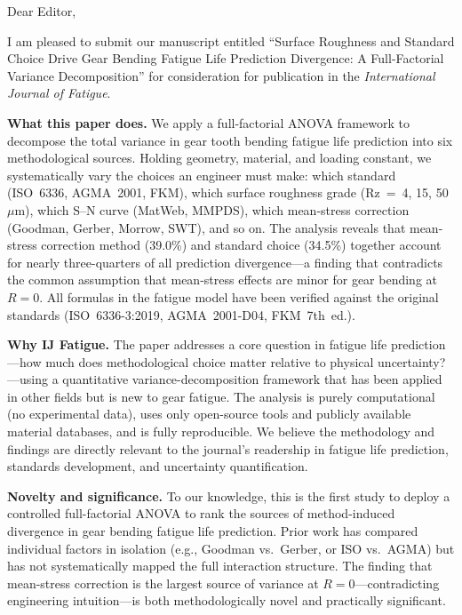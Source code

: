 \documentclass[12pt,a4paper]{article}
\begin{document}
\noindent Dear Editor,

\vspace{6pt}

\noindent I am pleased to submit our manuscript entitled
``Surface Roughness and Standard Choice Drive Gear Bending Fatigue
Life Prediction Divergence: A Full-Factorial Variance Decomposition''
for consideration for publication in the \textit{International Journal
of Fatigue}.

\vspace{6pt}

\noindent\textbf{What this paper does.}
We apply a full-factorial ANOVA framework to decompose the total
variance in gear tooth bending fatigue life prediction into six
methodological sources. Holding geometry, material, and loading
constant, we systematically vary the choices an engineer must make:
which standard (ISO~6336, AGMA~2001, FKM), which surface roughness
grade (Rz~=~4, 15, 50~$\mu$m), which S--N curve (MatWeb, MMPDS), which
mean-stress correction (Goodman, Gerber, Morrow, SWT), and so on. The
analysis reveals that mean-stress correction method (39.0\%) and
standard choice (34.5\%) together account for nearly three-quarters of
all prediction divergence---a finding that contradicts the common
assumption that mean-stress effects are minor for gear bending at
$R=0$. All formulas in the fatigue model have been verified against the
original standards (ISO~6336-3:2019, AGMA~2001-D04, FKM~7th~ed.).

\vspace{6pt}

\noindent\textbf{Why IJ Fatigue.}
The paper addresses a core question in fatigue life prediction---how
much does methodological choice matter relative to physical
uncertainty?---using a quantitative variance-decomposition framework
that has been applied in other fields but is new to gear fatigue. The
analysis is purely computational (no experimental data), uses only
open-source tools and publicly available material databases, and is
fully reproducible. We believe the methodology and findings are
directly relevant to the journal's readership in fatigue life
prediction, standards development, and uncertainty quantification.

\vspace{6pt}

\noindent\textbf{Novelty and significance.}
To our knowledge, this is the first study to deploy a controlled
full-factorial ANOVA to rank the sources of method-induced divergence
in gear bending fatigue life prediction. Prior work has compared
individual factors in isolation (e.g., Goodman vs.\ Gerber, or ISO vs.\
AGMA) but has not systematically mapped the full interaction structure.
The finding that mean-stress correction is the largest source of
variance at $R=0$---contradicting engineering intuition---is both
methodologically novel and practically significant.
\end{document}
